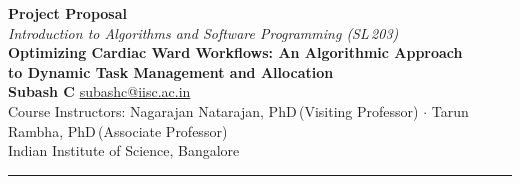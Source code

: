 \documentclass{article}
\begin{document}
\begin{center}
  {\LARGE\textbf{Project Proposal}}\\[0.4em]
  {\normalsize\textit{Introduction to Algorithms and Software Programming (SL\,203)}}\\[0.8em]
  {\Large\textbf{Optimizing Cardiac Ward Workflows: An Algorithmic Approach\\
  to Dynamic Task Management and Allocation}}\\[0.8em]
  {\normalsize\textbf{Subash C}\quad\textbar\quad
  \href{mailto:subashc@iisc.ac.in}{subashc@iisc.ac.in}}\\[0.3em]
  {\small Course Instructors: Nagarajan Natarajan, PhD\,(Visiting Professor)
  \;\(\cdot\)\; Tarun Rambha, PhD\,(Associate Professor)}\\[0.2em]
  {\small Indian Institute of Science, Bangalore}
\end{center}

\vspace{0.5em}
\textcolor{ruleblue}{\rule{\linewidth}{0.8pt}}
\vspace{0.3em}






% 
\end{document}
